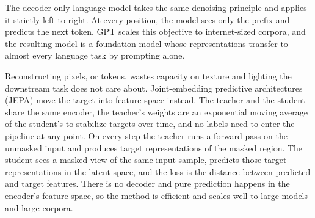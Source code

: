 The decoder-only language model takes the same denoising principle and applies it strictly left to right.
At every position, the model sees only the prefix and predicts the next token.
GPT scales this objective to internet-sized corpora, 
and the resulting model is a foundation model whose representations transfer
to almost every language task by prompting alone.


Reconstructing pixels, or tokens, wastes capacity on texture and lighting the downstream task does not care about.
Joint-embedding predictive architectures (JEPA) move the target into feature space instead.
The teacher and the student share the same encoder,
the teacher's weights are an exponential moving average of the student's to stabilize targets over time,
and no labels need to enter the pipeline at any point.
On every step the teacher runs a forward pass on the unmasked input
and produces target representations of the masked region.
The student sees a masked view of the same input sample,
predicts those target representations in the latent space,
and the loss is the distance between predicted and target features.
There is no decoder and pure prediction happens in the encoder's feature space, so the method is
efficient and scales well to large models and large corpora.


